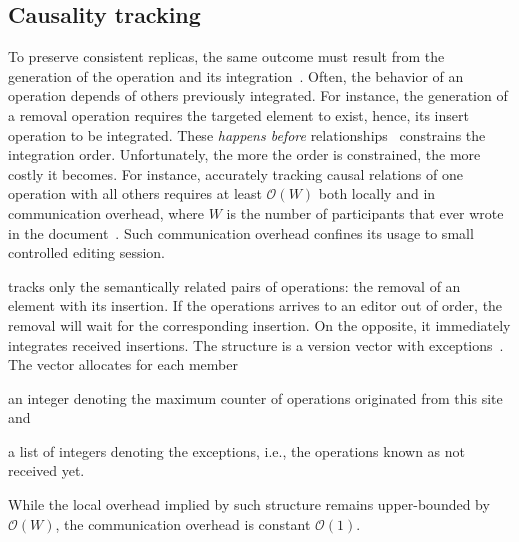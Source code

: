 

\subsection{Causality tracking}
\label{subsec:causality}

To preserve consistent replicas, the same outcome must result from the
generation of the operation and its integration~\cite{sun1998achieving}. Often,
the behavior of an operation depends of others previously integrated. For
instance, the generation of a removal operation requires the targeted element to
exist, hence, its insert operation to be integrated. These \emph{happens before}
relationships~\cite{lamport1978time} constrains the integration order.
Unfortunately, the more the order is constrained, the more costly it becomes. For
instance, accurately tracking causal relations of one operation with all others
requires at least $\mathcal{O}(W)$ both locally and in communication overhead,
where $W$ is the number of participants that ever wrote in the
document~\cite{charronbost1991concerning}. Such communication overhead confines
its usage to small controlled editing session.

\CRATE tracks only the semantically related pairs of operations: the removal of
an element with its insertion. If the operations arrives to an editor out of
order, the removal will wait for the corresponding insertion. On the opposite,
it immediately integrates received insertions. The structure is a version vector
with exceptions~\cite{malkhi2007concise, mukund2014optimized}. The vector
allocates for each member
\begin{inparaenum}[(i)]
\item an integer denoting the maximum counter of operations originated from
  this site and
\item a list of integers denoting the exceptions, i.e., the operations known
  as not received yet.
\end{inparaenum}
While the local overhead implied by such structure remains upper-bounded by
$\mathcal{O}(W)$, the communication overhead is constant $\mathcal{O}(1)$.

